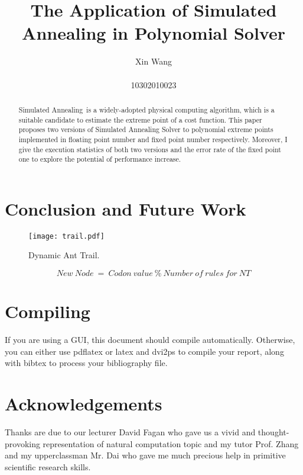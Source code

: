 \documentclass[twocolumn]{article}
\newcommand{\SA}{Simulated Annealing~}
\begin{document}
\title{{\bf The Application of Simulated Annealing in Polynomial Solver}\\ }

\author{Xin Wang\\ \vspace{0.5cm}\\
 10302010023}

\date{}
\maketitle
\begin{abstract}
\SA is a widely-adopted physical computing algorithm, which is a suitable candidate to estimate the extreme point of a cost function. This paper proposes two versions of Simulated Annealing Solver to polynomial extreme points implemented in floating point number and fixed point number respectively. Moreover, I give the execution statistics of both two versions and the error rate of the fixed point one to explore the potential of performance increase.
\end{abstract}











\section{Conclusion and Future Work}
\label{sec:conclusion}


\begin{figure}
\centering
\texttt{[image: trail.pdf]}
\caption{Dynamic Ant Trail.}
\label{fig:trail}
\end{figure}

\begin{equation} New\ Node\ =\ Codon\ value\ \%\ Number\ of\ rules\ for\ NT
\label{eq1}
\end{equation}



\section{Compiling}

If you are using a GUI, this document should compile automatically. Otherwise,
you can either use pdflatex or latex and dvi2ps to compile your report, along
with bibtex to process your bibliography file.

\section{Acknowledgements}
Thanks are due to our lecturer David Fagan who gave us a vivid and thought-provoking representation of natural computation topic and my tutor Prof. Zhang and my upperclassman Mr. Dai who gave me much precious help in primitive scientific research skills.



\end{document}
